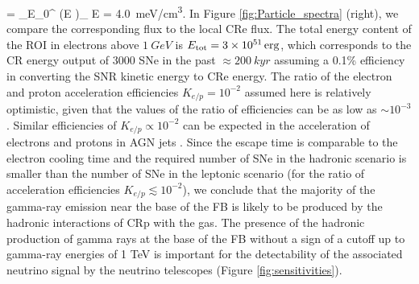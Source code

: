 \be
{} = \int_{E_0}^{\infty} \left(E \right)_{\!\!\el} \de E = \SI{4.0}{meV/cm^3}.
\ee
In Figure \ref{fig:Particle_spectra} (right), we compare the corresponding flux to the local CRe flux.
The total energy content of the ROI in electrons above $\SI{1}{GeV}$ is $E_{\text{tot}} = \SI{3e51}{erg}$, which corresponds to the CR energy output of 3000 SNe in the past $\approx \SI{200}{kyr}$ assuming a 0.1\% efficiency in converting the SNR kinetic energy to CRe energy.
The ratio of the electron and proton acceleration efficiencies $K_{e/p} = 10^{-2}$ assumed here is relatively optimistic,
given that the values of the ratio of efficiencies can be as low as $\sim 10^{-3}$ \citep[e.g.,][]{2015PhRvL.114h5003P}.
Similar efficiencies of $K_{e/p} \propto 10^{-2}$ can be expected in the acceleration of 
electrons and protons in AGN jets \citep[e.g.,][]{2018arXiv180305556B}.
Since the escape time is comparable to the electron cooling time and the required number of SNe in the hadronic
scenario is smaller than the number of SNe in the leptonic scenario (for the ratio of acceleration efficiencies $K_{e/p} \lesssim 10^{-2}$),
we conclude that the majority of the gamma-ray emission near the base of the FB 
is likely to be produced by the hadronic interactions of CRp with the gas.
The presence of the hadronic production of gamma rays at the base of the FB without a sign of a cutoff up to gamma-ray energies
of 1 TeV is important for the detectability of the associated neutrino signal by the neutrino telescopes (Figure \ref{fig:sensitivities}).

